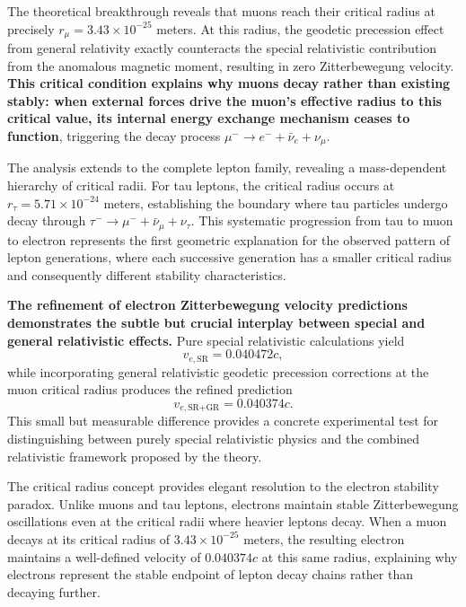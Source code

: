 \documentclass[%
 reprint,
 amsmath,amssymb,
 aps,
]{revtex4-1}
\numberwithin{equation}{section}%
\begin{document}
The theoretical breakthrough reveals that muons reach their critical radius at precisely $r_{\mu} = 3.43 \times 10^{-25}$ meters. At this radius, the geodetic precession effect from general relativity exactly counteracts the special relativistic contribution from the anomalous magnetic moment, resulting in zero Zitterbewegung velocity. \textbf{This critical condition explains why muons decay rather than existing stably: when external forces drive the muon's effective radius to this critical value, its internal energy exchange mechanism ceases to function}, triggering the decay process $\mu^- \rightarrow e^- + \bar{\nu}_e + \nu_{\mu}$.

The analysis extends to the complete lepton family, revealing a mass-dependent hierarchy of critical radii. For tau leptons, the critical radius occurs at $r_{\tau} = 5.71 \times 10^{-24}$ meters, establishing the boundary where tau particles undergo decay through $\tau^- \rightarrow \mu^- + \bar{\nu}_{\mu} + \nu_{\tau}$. This systematic progression from tau to muon to electron represents the first geometric explanation for the observed pattern of lepton generations, where each successive generation has a smaller critical radius and consequently different stability characteristics.

\textbf{The refinement of electron Zitterbewegung velocity predictions demonstrates the subtle but crucial interplay between special and general relativistic effects.} Pure special relativistic calculations yield
\begin{equation}
v_{e,\text{SR}} = 0.040472c,
\label{eq:v_e_SR}
\end{equation}
while incorporating general relativistic geodetic precession corrections at the muon critical radius produces the refined prediction
\begin{equation}
v_{e,\text{SR+GR}} = 0.040374c.
\label{eq:v_e_SR_GR}
\end{equation}
This small but measurable difference provides a concrete experimental test for distinguishing between purely special relativistic physics and the combined relativistic framework proposed by the theory.

The critical radius concept provides elegant resolution to the electron stability paradox. Unlike muons and tau leptons, electrons maintain stable Zitterbewegung oscillations even at the critical radii where heavier leptons decay. When a muon decays at its critical radius of $3.43 \times 10^{-25}$ meters, the resulting electron maintains a well-defined velocity of $0.040374c$ at this same radius, explaining why electrons represent the stable endpoint of lepton decay chains rather than decaying further.
\end{document}
